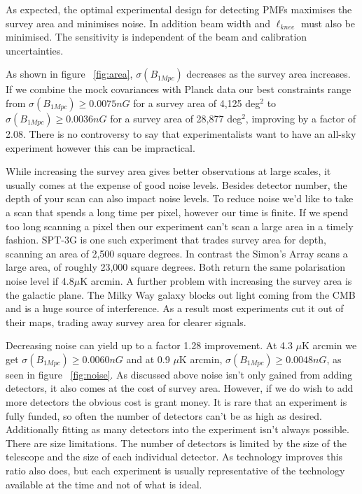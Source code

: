As expected, the optimal experimental design for detecting PMFs maximises the survey area and minimises noise. In addition beam width and $\ell_{knee}$ must also be minimised. The sensitivity is independent of the beam and calibration uncertainties.

As shown in figure ~\ref{fig:area}, $\sigma(B_{1Mpc})$ decreases as the survey area increases. If we combine the mock covariances with Planck data our best constraints range from $\sigma(B_{1Mpc}) \geq 0.0075nG$ for a survey area of 4,125 deg$^2$ to $\sigma(B_{1Mpc}) \geq 0.0036nG$ for a survey area of 28,877 deg$^2$, improving by a factor of 2.08. There is no controversy to say that experimentalists want to have an all-sky experiment however this can be impractical. 

While increasing the survey area gives better observations at large scales, it usually comes at the expense of good noise levels. Besides detector number, the depth of your scan can also impact noise levels. To reduce noise we'd like to take a scan that spends a long time per pixel, however our time is finite. If we spend too long scanning a pixel then our experiment can't scan a large area in a timely fashion. SPT-3G is one such experiment that trades survey area for depth, scanning an area of 2,500 square degrees. In contrast the Simon's Array scans a large area, of roughly 23,000 square degrees. Both return the same polarisation noise level if 4.8$\mu$K arcmin. A further problem with increasing the survey area is the galactic plane. The Milky Way galaxy blocks out light coming from the CMB and is a huge source of interference. As a result most experiments cut it out of their maps, trading away survey area for clearer signals.

Decreasing noise can yield up to a factor 1.28 improvement. At 4.3 $\mu$K arcmin we get $\sigma(B_{1Mpc}) \geq 0.0060nG$ and at 0.9 $\mu$K arcmin, $\sigma(B_{1Mpc}) \geq 0.0048nG$, as seen in figure ~\ref{fig:noise}. As discussed above noise isn't only gained from adding detectors, it also comes at the cost of survey area. However, if we do wish to add more detectors the obvious cost is grant money. It is rare that an experiment is fully funded, so often the number of detectors can't be as high as desired. Additionally fitting as many detectors into the experiment isn't always possible. There are size limitations. The number of detectors is limited by the size of the telescope and the size of each individual detector. As technology improves this ratio also does, but each experiment is usually representative of the technology available at the time and not of what is ideal.

